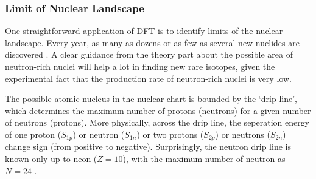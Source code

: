 \begin{comment}
Various EFT models are based on an effective interacting Lagragian, for example,
FSUGold model has the following effective Lagrangian \cite{PhysRevLett.95.122501}:
\begin{equation}
    \begin{aligned}
	\CL_{\text{int}} = &\bar{\psi} \left[ g_s\phi - \left( g_v V_\mu + \frac{g_\rho}{2}\vec{\tau}\cdot\vec{b}_\mu + \frac{e}{2}(1 + \tau_3) A_\mu \right)\gamma^\mu \right]\psi \\
	    & - \frac{\kappa}{3!}(g_s\phi)^3 - \frac{\lambda}{4!}(g_s\phi)^4 + \frac{\zeta}{4!}(g_v^2 V_\mu V^\mu )^2	\\
	    & + \Lambda_v(g_\rho^2\vec{b}_\mu\vec{b}^\mu)(g_v^2 V_\mu V^\mu)
    \end{aligned}
\end{equation}
This Lagrangian density descirbes interactions of the nucleon field $\psi$ to
various meson fields and their self-interctions. $\phi$ is a scalar.

The difference between different EFT models is just how many coupling they
include in their effetive Lagrangian density. With the Lagrangian density,
one can calculate the properties of various nuclei, fitting predicted values
to experimental results to get a parameter set for the coupling constant in
the Lagrangian, which is called one model. Frequently used EFT models include
NL3 \cite{}, FSUGold \cite{} and 
\end{comment}

\subsubsection{Limit of Nuclear Landscape}
One straightforward application of DFT is to identify limits of the nuclear
landscape. Every year, as many as dozens or as few as several new nuclides
are discovered \cite{NEW_NULCIDES}. A clear guidance from the theory part
about the possible area of neutron-rich nuclei will help a lot in finding 
new rare isotopes, given the experimental fact that the production rate of 
neutron-rich nuclei is very low.

The possible atomic nucleus in the nuclear chart is bounded by the 
`drip line', which determines the maximum number of protons (neutrons) for a 
given number of neutrons (protons). More physically, across the drip line, the
seperation energy of one proton ($S_{1p}$) or neutron ($S_{1n}$) 
or two protons ($S_{2p}$) or neutrons ($S_{2n}$) change sign (from positive to negative).
Surprisingly, the neutron drip line is known only up to neon ($Z=10$), with the 
maximum number of neutron as $N=24$ \cite{PhysRevLett.123.212501}. 

